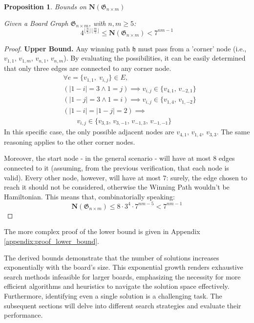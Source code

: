 \documentclass[conference]{IEEEtran}
\newtheorem{proposition}{Proposition}[section]
\begin{document}
\begin{proposition}{Bounds on $\mathbf{N}(\mathfrak{G}_{n \times m})$}{}
\label{prop:bounds_number_of_solutions}

Given a Board Graph $\mathfrak{G}_{n \times m}$, with $n, m \ge 5$:
$$
    4^{\lfloor{\frac{n}{5}}\rfloor \lfloor{\frac{m}{5}}\rfloor} \le \mathbf{N}(\mathfrak{G}_{n \times m}) < 7^{nm - 1}
$$
\end{proposition}
\begin{proof}
    \textbf{Upper Bound.} 
        Any winning path $\mathfrak{h}$ must pass from a 'corner' node (i.e., $v_{1,1},\,v_{1,m},\,v_{n,1},\,v_{n,m}$). By evaluating the possibilities, it can be easily determined that only three edges are connected to any corner node.
        \begin{align*}
            &\forall e = \{v_{1,1},\;v_{i,j}\} \in E, \\
            &(|1 - i| = 3 \land 1 = j) \implies v_{i,j} \in \{v_{4,1},\,v_{-2,1}\} \\
            &(|1 - j| = 3 \land 1 = i) \implies v_{i,j} \in \{v_{1,4},\,v_{1,-2}\} \\
            &(|1 - i| = |1 - j| = 2) \implies \\
            &\quad\quad v_{i,j} \in \{v_{3,3},\,v_{3,-1},\,v_{-1,3},\,v_{-1,-1}\}
        \end{align*}
        In this specific case, the only possible adjacent nodes are $v_{4,1},\,v_{1,4},\,v_{3,3}$. The same reasoning applies to the other corner nodes.

        Moreover, the start node - in the general scenario - will have at most $8$ edges connected to it (assuming, from the previous verification, that each node is valid). Every other node, however, will have at most $7$: surely, the edge chosen to reach it should not be considered, otherwise the Winning Path wouldn't be Hamiltonian.
        This means that, combinatorially speaking:
        $$
            \mathbf{N}(\mathfrak{G}_{n \times m}) \leq 8 \cdot 3^4 \cdot 7^{nm - 5} < 7^{nm - 1}
        $$
\end{proof}
The more complex proof of the lower bound is given in Appendix \ref{appendix:proof_lower_bound}.

The derived bounds demonstrate that the number of solutions increases exponentially with the board's size. This exponential growth renders exhaustive search methods infeasible for larger boards, emphasizing the necessity for more efficient algorithms and heuristics to navigate the solution space effectively. 
Furthermore, identifying even a single solution is a challenging task. The subsequent sections will delve into different search strategies and evaluate their performance.
\end{document}
